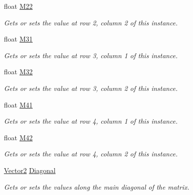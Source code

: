 \begin{DoxyCompactItemize}
float \hyperlink{struct_open_t_k_1_1_matrix4x2_aa0cc49d4f6bd80af78d29f2b4f159920}{M22}
\begin{DoxyCompactList}\small\item\em Gets or sets the value at row 2, column 2 of this instance. \end{DoxyCompactList}\item 
float \hyperlink{struct_open_t_k_1_1_matrix4x2_a21a388c8e851b2f23f7cac29a04b2b96}{M31}
\begin{DoxyCompactList}\small\item\em Gets or sets the value at row 3, column 1 of this instance. \end{DoxyCompactList}\item 
float \hyperlink{struct_open_t_k_1_1_matrix4x2_a473679a8455c2bb19f9a94f50009f1c3}{M32}
\begin{DoxyCompactList}\small\item\em Gets or sets the value at row 3, column 2 of this instance. \end{DoxyCompactList}\item 
float \hyperlink{struct_open_t_k_1_1_matrix4x2_aeb4705636436f1714caf90227877da03}{M41}
\begin{DoxyCompactList}\small\item\em Gets or sets the value at row 4, column 1 of this instance. \end{DoxyCompactList}\item 
float \hyperlink{struct_open_t_k_1_1_matrix4x2_a5d4d59dc36920b16dfcab6b6f520984d}{M42}
\begin{DoxyCompactList}\small\item\em Gets or sets the value at row 4, column 2 of this instance. \end{DoxyCompactList}\item 
\hyperlink{struct_open_t_k_1_1_vector2}{Vector2} \hyperlink{struct_open_t_k_1_1_matrix4x2_ab824516b82bcee1c62a714db6d0378a4}{Diagonal}
\begin{DoxyCompactList}\small\item\em Gets or sets the values along the main diagonal of the matrix. \end{DoxyCompactList}\item 

\end{DoxyCompactItemize}
